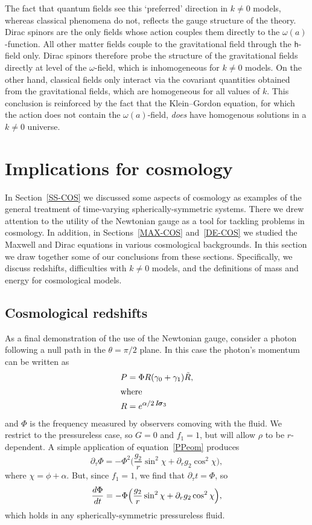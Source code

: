 \documentclass[a4paper]{article}
\numberwithin{equation}{section}
\newcommand{\et}[1]{e^{\mbox{\footnotesize $#1$}}}
\newcommand{\alp}{\alpha}
\newcommand{\sig}{\mbox{\boldmath $\sigma$}}
\newcommand{\om}{\omega}
\newcommand{\bsig}{\mbox{\boldmath $\sig$}}
\newcommand{\dr}{\partial_r}
\newcommand{\isk}{I \hspace{-1pt} \bsig_3}
\newcommand{\gi}{\gamma_{1}}
\newcommand{\go}{\gamma_{0}}
\newcommand{\Rrev}{\tilde{R}}
\newcommand{\lih}{\mathsf{h}}
\begin{document}
The fact that quantum fields see this `preferred' direction in
$k\neq0$ models, whereas classical phenomena do not, reflects the
gauge structure of the theory.  Dirac spinors are the only fields
whose action couples them directly to the $\om(a)$-function.  All
other matter fields couple to the gravitational field through the
$\lih$-field only.  Dirac spinors therefore probe the structure of the
gravitational fields directly at level of the $\om$-field, which is
inhomogeneous for $k\neq 0$ models.  On the other hand, classical
fields only interact via the covariant quantities obtained from the
gravitational fields, which are homogeneous for all values of $k$.
This conclusion is reinforced by the fact that the Klein--Gordon
equation, for which the action does not contain the $\om(a)$-field,
\textit{does\/} have homogenous solutions in a $k\neq 0$ universe.


 
\section{Implications for cosmology}
\label{Cos}


In Section~\ref{SS-COS} we discussed some aspects of cosmology as
examples of the general treatment of time-varying spherically-symmetric
systems.  There we drew attention to the utility of the Newtonian
gauge as a tool for tackling problems in cosmology.  In addition, in
Sections~\ref{MAX-COS} and~\ref{DE-COS} we studied the Maxwell and
Dirac equations in various cosmological backgrounds.  In this section
we draw together some of our conclusions from these
sections. Specifically, we discuss redshifts, difficulties with $k\neq
0$ models, and the definitions of mass and energy for cosmological
models.


\subsection{Cosmological redshifts}

As a final demonstration of the use of the Newtonian gauge, consider a
photon following a null path in the $\theta=\pi/2$ plane.  In this case
the photon's momentum can be written as
%
\begin{align}
P &= \Phi R (\go + \gi) \Rrev, \\
%
\intertext{where}
%
R &= \et{\alp/2 \, \isk}
\end{align}
%
and $\Phi$ is the frequency measured by observers comoving with the
fluid.  We restrict to the pressureless case, so $G=0$ and $f_1=1$,
but will allow $\rho$ to be $r$-dependent.  A simple application
of equation~\eqref{PPeom} produces
%
\begin{equation}
\partial_\tau \Phi = - \Phi^2 \bigl( \frac{g_2}{r} \sin^2\chi + \dr
g_2 \cos^2\chi \Bigr),
\end{equation}
%
where $\chi=\phi+\alp$.  But, since $f_1=1$, we find that $\partial_\tau
t =\Phi$, so
%
\begin{equation}
\frac{d\Phi}{dt} = - \Phi \Bigl( \frac{g_2}{r} \sin^2\chi + \dr
g_2 \cos^2\chi \Bigr),
\label{ifc1.1}
\end{equation} 
%
which holds in any spherically-symmetric pressureless fluid.  
\end{document}
